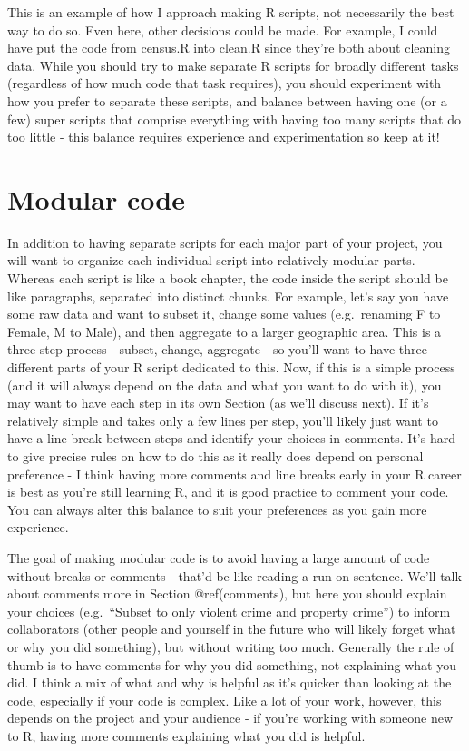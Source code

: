 \documentclass[
  a4paper,
]{krantz}
\begin{document}
This is an example of how I approach making R scripts, not
necessarily the best way to do so. Even here, other
decisions could be made. For example, I could have put the
code from census.R into clean.R since they're both about
cleaning data. While you should try to make separate R
scripts for broadly different tasks (regardless of how much
code that task requires), you should experiment with how you
prefer to separate these scripts, and balance between having
one (or a few) super scripts that comprise everything with
having too many scripts that do too little - this balance
requires experience and experimentation so keep at it!

\hypertarget{modular-code}{%
\section{Modular code}\label{modular-code}}

In addition to having separate scripts for each major part
of your project, you will want to organize each individual
script into relatively modular parts. Whereas each script is
like a book chapter, the code inside the script should be
like paragraphs, separated into distinct chunks. For
example, let's say you have some raw data and want to subset
it, change some values (e.g.~renaming F to Female, M to
Male), and then aggregate to a larger geographic area. This
is a three-step process - subset, change, aggregate - so
you'll want to have three different parts of your R script
dedicated to this. Now, if this is a simple process (and it
will always depend on the data and what you want to do with
it), you may want to have each step in its own Section (as
we'll discuss next). If it's relatively simple and takes
only a few lines per step, you'll likely just want to have a
line break between steps and identify your choices in
comments. It's hard to give precise rules on how to do this
as it really does depend on personal preference - I think
having more comments and line breaks early in your R career
is best as you're still learning R, and it is good practice
to comment your code. You can always alter this balance to
suit your preferences as you gain more experience.

The goal of making modular code is to avoid having a large
amount of code without breaks or comments - that'd be like
reading a run-on sentence. We'll talk about comments more in
Section @ref(comments), but here you should explain your
choices (e.g.~``Subset to only violent crime and property
crime'') to inform collaborators (other people and yourself
in the future who will likely forget what or why you did
something), but without writing too much. Generally the rule
of thumb is to have comments for why you did something, not
explaining what you did. I think a mix of what and why is
helpful as it's quicker than looking at the code, especially
if your code is complex. Like a lot of your work, however,
this depends on the project and your audience - if you're
working with someone new to R, having more comments
explaining what you did is helpful.
\end{document}
